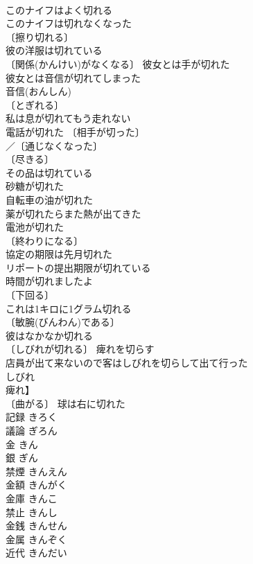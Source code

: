 \documentclass[8pt]{extreport}
\begin{document}
\begin{CJK}{UTF8}{min}
\\	このナイフはよく切れる 
\\	このナイフは切れなくなった 
\\	〔擦り切れる〕
\\	彼の洋服は切れている 
\\	〔関係(かんけい)がなくなる〕 彼女とは手が切れた 
\\	彼女とは音信が切れてしまった 
\\	音信(おんしん)　
\\	〔とぎれる〕　
\\	私は息が切れてもう走れない 
\\	電話が切れた 〔相手が切った〕
\\	／〔通じなくなった〕
\\	〔尽きる〕
\\	その品は切れている 
\\	砂糖が切れた 
\\	自転車の油が切れた 
\\	薬が切れたらまた熱が出てきた 
\\	電池が切れた 
\\	〔終わりになる〕
\\	協定の期限は先月切れた 
\\	リポートの提出期限が切れている 
\\	時間が切れましたよ 
\\	〔下回る〕
\\	これは1キロに1グラム切れる 
\\	〔敏腕(びんわん)である〕
\\	彼はなかなか切れる 
\\	〔しびれが切れる〕 痺れを切らす 
\\	店員が出て来ないので客はしびれを切らして出て行った 
\\	しびれ
\\	痺れ】 
\\	〔曲がる〕 球は右に切れた 
\\	記録	きろく	
\\	議論	ぎろん	
\\	金	きん	
\\	銀	ぎん	
\\	禁煙	きんえん	
\\	金額	きんがく	
\\	金庫	きんこ	
\\	禁止	きんし	
\\	金銭	きんせん	
\\	金属	きんぞく	
\\	近代	きんだい	

\end{CJK}
\end{document}
